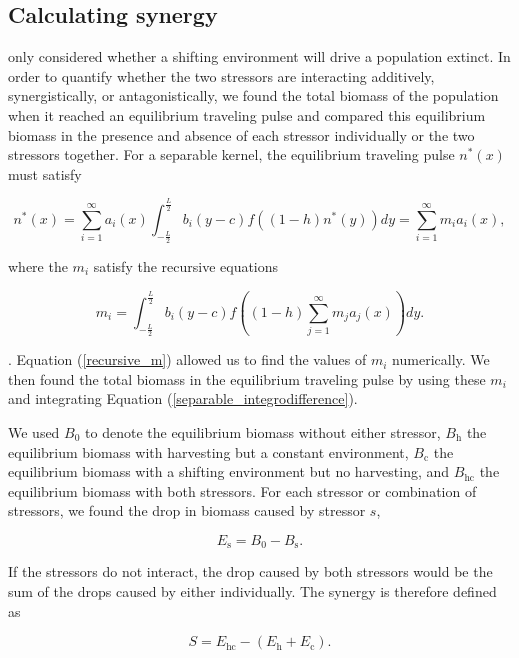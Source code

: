 \documentclass[12pt,english]{article}
\begin{document}
\begin{spacing}{1.9}
\begin{flushleft}
\subsection{Calculating synergy }

\citet{ZhouKot2011} only considered whether a shifting environment will drive a population extinct.   In order to quantify whether the two stressors are interacting additively, synergistically, or antagonistically, we found the total biomass of the population when it reached an equilibrium traveling pulse and 
compared this equilibrium biomass in the presence and absence of each stressor individually or the two stressors together.  For a separable kernel, the equilibrium traveling pulse $n^*(x)$ must satisfy 

\begin{equation}
n^*(x)=\sum^\infty_{i=1}
a_i(x)\int^{\frac{L}{2}}_{-\frac{L}{2}}b_i(y-c)f((1-h)n^*(y))dy=\sum^\infty_{i=1}m_ia_i(x), \label{separable_integrodifference}
\end{equation}

\noindent where the $m_i$ satisfy the recursive equations

\begin{equation}
m_i=\int^{\frac{L}{2}}_{-\frac{L}{2}}b_i(y-c)f\left((1-h)\sum^\infty_{j=1}m_ja_j(x)\right)
dy. \label{recursive_m}
\end{equation}

\noindent \citep{Latore:1998fk}. Equation (\ref{recursive_m}) allowed us to find the values of $m_i$ numerically. We then found the total biomass in the 
equilibrium traveling pulse by using these $m_i$ and integrating Equation (\ref{separable_integrodifference}).


We used $B_0$ to denote the equilibrium biomass 
without either stressor, $B_\text{h}$ the equilibrium biomass with harvesting but a constant environment, $B_\text{c}$ the 
equilibrium biomass with a shifting environment but no harvesting, and $B_\text{hc}$ the equilibrium biomass with 
both stressors. For each stressor or combination of stressors, we found the drop in  biomass caused 
by stressor $s$,

\[E_\text{s}=B_0-B_\text{s}.\]

\noindent If the stressors do not interact, the drop caused by both stressors would be the sum of the drops caused by 
either individually. The synergy is therefore defined as

\[S = E_\text{hc}-\left(E_\text{h}+E_\text{c}\right).\]


\end{flushleft}
\end{spacing}
\end{document}
